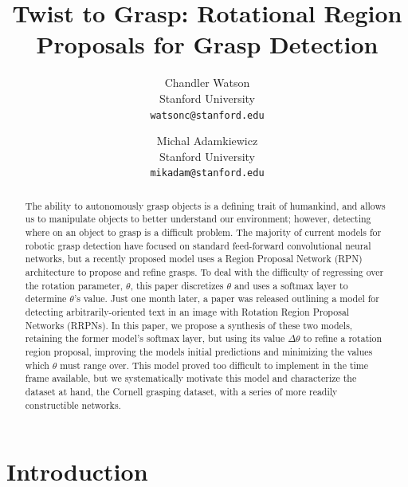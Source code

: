 \documentclass[10pt,twocolumn,letterpaper]{article}
\begin{document}
\title{Twist to Grasp: Rotational Region Proposals for Grasp Detection}

\author{Chandler Watson\\
Stanford University\\
{\tt\small watsonc@stanford.edu}
\and
Michal Adamkiewicz\\
Stanford University\\
{\tt\small mikadam@stanford.edu}
}

\maketitle

\begin{abstract}
   The ability to autonomously grasp objects is a defining trait of humankind, and allows us to manipulate objects to better understand our environment; however, detecting where on an object to grasp is a difficult problem. The majority of current models for robotic grasp detection have focused on standard feed-forward convolutional neural networks, but a recently proposed model uses a Region Proposal Network (RPN) architecture to propose and refine grasps. To deal with the difficulty of regressing over the rotation parameter, $\theta$, this paper discretizes $\theta$ and uses a softmax layer to determine $\theta$'s value. Just one month later, a paper was released outlining a model for detecting arbitrarily-oriented text in an image with Rotation Region Proposal Networks (RRPNs). In this paper, we propose a synthesis of these two models, retaining the former model's softmax layer, but using its value $\Delta \theta$ to refine a rotation region proposal, improving the models initial predictions and minimizing the values which $\theta$ must range over. This model proved too difficult to implement in the time frame available, but we systematically motivate this model and characterize the dataset at hand, the Cornell grasping dataset, with a series of more readily constructible networks.
\end{abstract}

\section{Introduction}
\end{document}
